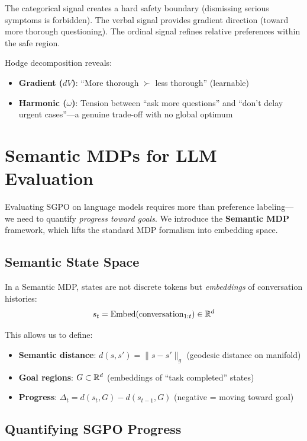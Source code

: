 The categorical signal creates a hard safety boundary (dismissing serious symptoms is forbidden). The verbal signal provides gradient direction (toward more thorough questioning). The ordinal signal refines relative preferences within the safe region.

Hodge decomposition reveals:
\begin{itemize}
    \item \textbf{Gradient ($dV$)}: ``More thorough $\succ$ less thorough'' (learnable)
    \item \textbf{Harmonic ($\omega$)}: Tension between ``ask more questions'' and ``don't delay urgent cases''---a genuine trade-off with no global optimum
\end{itemize}

\section{Semantic MDPs for LLM Evaluation}
\label{app:semantic_mdp}

Evaluating SGPO on language models requires more than preference labeling---we need to quantify \emph{progress toward goals}. We introduce the \textbf{Semantic MDP} framework, which lifts the standard MDP formalism into embedding space.

\subsection{Semantic State Space}

In a Semantic MDP, states are not discrete tokens but \emph{embeddings} of conversation histories:
\begin{equation}
s_t = \text{Embed}(\text{conversation}_{1:t}) \in \mathbb{R}^d
\end{equation}

This allows us to define:
\begin{itemize}
    \item \textbf{Semantic distance}: $d(s, s') = \|s - s'\|_g$ (geodesic distance on manifold)
    \item \textbf{Goal regions}: $G \subset \mathbb{R}^d$ (embeddings of ``task completed'' states)
    \item \textbf{Progress}: $\Delta_t = d(s_t, G) - d(s_{t-1}, G)$ (negative = moving toward goal)
\end{itemize}

\subsection{Quantifying SGPO Progress}

